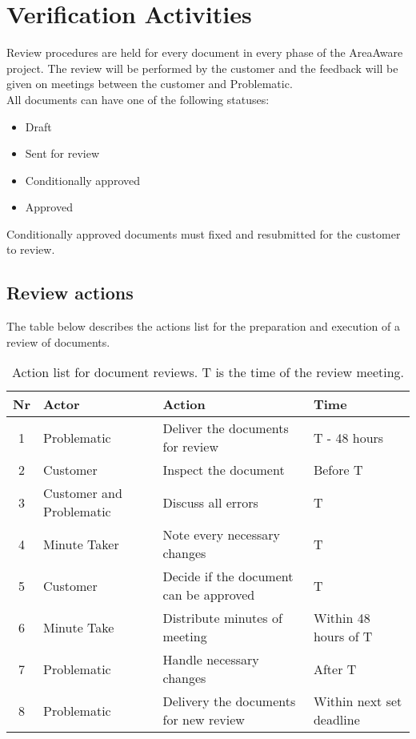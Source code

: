 \label{chp:verificationActivities}
\chapter{Verification Activities}

Review procedures are held for every document in every phase of the AreaAware project. 
The review will be performed by the customer and the feedback will be given on meetings between the customer and Problematic. \\
All documents can have one of the following statuses:
\begin{itemize}
    \item Draft
    \item Sent for review
    \item Conditionally approved
    \item Approved
\end{itemize}
Conditionally approved documents must fixed and resubmitted for the customer to review.

\section{Review actions}
The table below describes the actions list for the preparation and execution of a review of documents.
\begin{table}[ht]
    \centering
    \begin{tabular}{|c|l|p{5cm}|l|}
        \hline 
        \textbf{Nr} & \textbf{Actor} & \textbf{Action} & \textbf{Time} \\ 
        \hline
        1 & Problematic & Deliver the documents for review & T - 48 hours \\ 
        \hline  
        2 & Customer & Inspect the document & Before T \\ 
        \hline  
        3 & Customer and Problematic & Discuss all errors & T \\
        \hline
        4 & Minute Taker & Note every necessary changes & T \\
        \hline
        5 & Customer & Decide if the document can be approved & T \\
        \hline
        6 & Minute Take & Distribute minutes of meeting & Within 48 hours of T \\
        \hline
        7 & Problematic & Handle necessary changes & After T \\
        \hline
        8 & Problematic & Delivery the documents for new review & Within next set deadline \\ 
        \hline  
    \end{tabular}
    \caption{Action list for document reviews. T is the time of the review meeting.}
\end{table}
